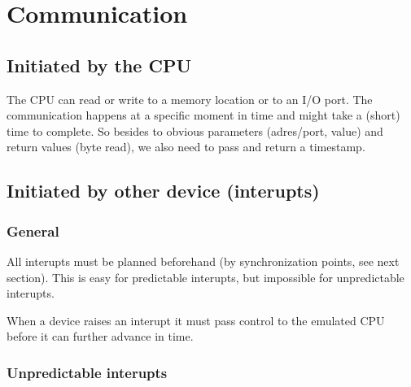 \documentclass[11pt, a4paper]{report}
\begin{document}
\section{Communication}

\subsection{Initiated by the CPU}

The CPU can read or write to a memory location or to an I/O port. The
communication happens at a specific moment in time and might take a (short) time
to complete. So besides to obvious parameters (adres/port, value) and return
values (byte read), we also need to pass and return a timestamp.


\subsection{Initiated by other device (interupts)}

\subsubsection{General}

All interupts must be planned beforehand (by synchronization points, see next
section). This is easy for predictable interupts, but impossible for
unpredictable interupts.

When a device raises an interupt it must pass control to the emulated CPU before
it can further advance in time.

\subsubsection{Unpredictable interupts}
\end{document}
